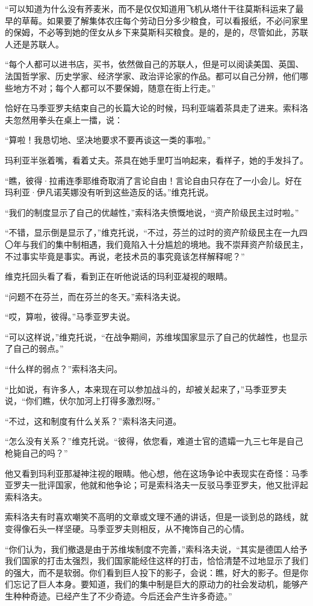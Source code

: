 “可以知道为什么没有荞麦米，而不是仅仅知道用飞机从塔什干往莫斯科运来了最早的草莓。如果要了解集体农庄每个劳动日分多少粮食，可以看报纸，不必问家里的保姆，不必等到她的侄女从乡下来莫斯科买粮食。是的，是的，尽管如此，苏联人还是苏联人。

“每个人都可以进书店，买书，依然做自己的苏联人，但是可以阅读美国、英国、法国哲学家、历史学家、经济学家、政治评论家的作品。都可以自己分辨，他们哪些地方不对；每个人都可以不要保姆，随意在街上行走。”

恰好在马季亚罗夫结束自己的长篇大论的时候，玛利亚端着茶具走了进来。索科洛夫忽然用拳头在桌上一擂，说：

“算啦！我恳切地、坚决地要求不要再谈这一类的事啦。”

玛利亚半张着嘴，看着丈夫。茶具在她手里叮当响起来，看样子，她的手发抖了。

“瞧，彼得·拉甫连季耶维奇取消了言论自由！言论自由只存在了一小会儿。好在玛利亚·伊凡诺芙娜没有听到这些造反的话。”维克托说。

“我们的制度显示了自己的优越性，”索科洛夫愤慨地说，“资产阶级民主过时啦。”

“不错，显示倒是显示了，”维克托说，“不过，芬兰的过时的资产阶级民主在一九四〇年与我们的集中制相遇，我们竟陷入十分尴尬的境地。我不崇拜资产阶级民主，不过事实毕竟是事实。再说，老技术员的事究竟该怎样解释呢？”

维克托回头看了看，看到正在听他说话的玛利亚凝视的眼睛。

“问题不在芬兰，而在芬兰的冬天。”索科洛夫说。

“哎，算啦，彼得。”马季亚罗夫说。

“可以这样说，”维克托说，“在战争期间，苏维埃国家显示了自己的优越性，也显示了自己的弱点。”

“什么样的弱点？”索科洛夫问。

“比如说，有许多人，本来现在可以参加战斗的，却被关起来了，”马季亚罗夫说，“你们瞧，伏尔加河上打得多激烈呀。”

“不过，这和制度有什么关系？”索科洛夫问道。

“怎么没有关系？”维克托说。“彼得，依您看，难道士官的遗孀一九三七年是自己枪毙自己的吗？”

他又看到玛利亚那凝神注视的眼睛。他心想，他在这场争论中表现实在奇怪：马季亚罗夫一批评国家，他就和他争论；可是索科洛夫一反驳马季亚罗夫，他又批评起索科洛夫。

索科洛夫有时喜欢嘲笑不高明的文章或文理不通的讲话，但是一谈到总的路线，就变得像石头一样坚硬。马季亚罗夫则相反，从不掩饰自己的心情。

“你们认为，我们撤退是由于苏维埃制度不完善，”索科洛夫说，“其实是德囯人给予我们国家的打击太强烈，我们国家能经住这样的打击，恰恰清楚不过地显示了我们的强大，而不是软弱。你们看到巨人投下的影子，会说：瞧，好大的影子。但是你们忘记了巨人本身。要知道，我们的集中制是巨大的原动力的社会发动机，能够产生种种奇迹。已经产生了不少奇迹。今后还会产生许多奇迹。”

